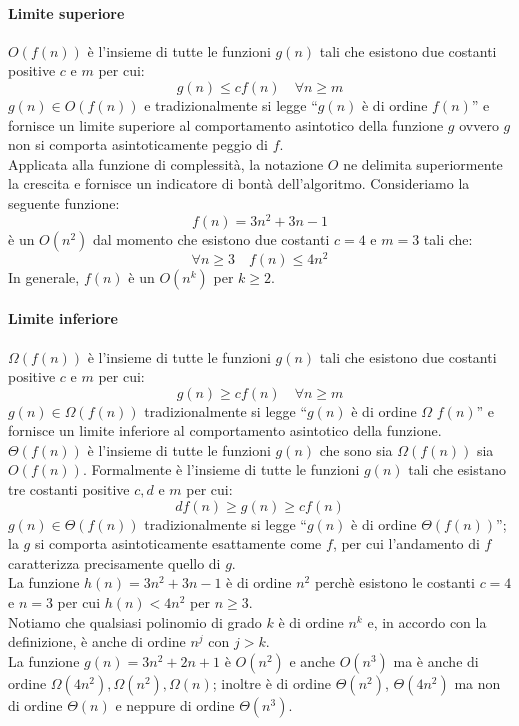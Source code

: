 \documentclass[12pt]{report}
\begin{document}
   	\paragraph{Limite superiore}
   	$O(f(n))$ è l'insieme di tutte le funzioni $g(n)$ tali che esistono due costanti positive $c$ e $m$ per cui:
   	\[
   	g(n) \leq cf(n) \quad \forall n \geq m
   	\]
   	$g(n) \in O(f(n))$ e tradizionalmente si legge ``$g(n)$ è di ordine $f(n)$'' e fornisce un limite superiore al comportamento asintotico della funzione $g$ ovvero $g$ non si comporta asintoticamente peggio di $f$. \\
   	Applicata alla funzione di complessità, la notazione $O$ ne delimita superiormente la crescita e fornisce un indicatore di bontà dell'algoritmo. Consideriamo la seguente funzione:
   	\[
   	f(n) = 3n^2 + 3n - 1
   	\]
   	è un $O(n^2)$ dal momento che esistono due costanti $c = 4$ e $m = 3$ tali che:
   	\[
   	\forall n \geq 3 \quad f(n) \leq 4n^2
   	\]
   	In generale, $f(n)$ è un $O(n^k)$ per $k \geq 2$. \\
   	\paragraph{Limite inferiore}
   	$\Omega(f(n))$ è l'insieme di tutte le funzioni $g(n)$ tali che esistono due costanti positive $c$ e $m$ per cui:
   	\[
   	g(n) \geq cf(n) \quad \forall n \geq m
   	\]
   	$g(n) \in \Omega(f(n))$ tradizionalmente si legge ``$g(n)$ è di ordine $\Omega$ $f(n)$'' e  fornisce un limite inferiore al comportamento asintotico della funzione. \\
   	$\Theta(f(n))$ è l'insieme di tutte le funzioni $g(n)$ che sono sia $\Omega(f(n))$ sia $O(f(n))$. Formalmente è l'insieme di tutte le funzioni $g(n)$ tali che esistano tre costanti positive $c, d$ e $m$ per cui:
   	\[
   	df(n) \geq g(n) \geq cf(n)
   	\]
   	$g(n) \in \Theta(f(n))$ tradizionalmente si legge ``$g(n)$ è di ordine $\Theta(f(n))$''; la $g$ si comporta asintoticamente esattamente come $f$, per cui l'andamento di $f$ caratterizza precisamente quello di $g$. \\
   	La funzione $h(n) = 3n^2 + 3n - 1$ è di ordine $n^2$ perchè esistono le costanti $c = 4$ e $n = 3$ per cui $h(n) < 4n^2$ per $n \geq 3$. \\
   	Notiamo che qualsiasi polinomio di grado $k$ è di ordine $n^k$ e, in accordo con la definizione, è anche di ordine $n^j$ con $j > k$. \\
   	La funzione $g(n) = 3n^2 + 2n + 1$ è $O(n^2)$ e anche $O(n^3)$ ma è anche di ordine $\Omega(4n^2), \Omega(n^2), \Omega(n)$; inoltre è di ordine $\Theta(n^2)$, $\Theta(4n^2)$ ma non di ordine $\Theta(n)$ e neppure di ordine $\Theta(n^3)$.
\end{document}

